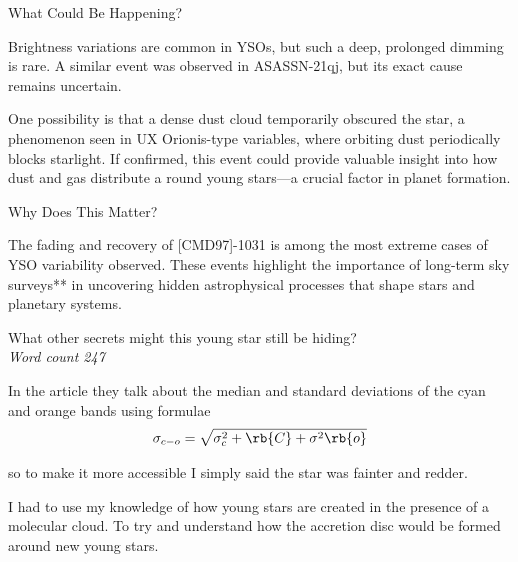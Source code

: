 \documentclass{tufte-handout}
\begin{document}
\begin{question}
{\Large What Could Be Happening?}

Brightness variations are common in YSOs, but such a deep, prolonged dimming is rare. A similar 
event was observed in ASASSN-21qj, but its exact cause remains uncertain.

One possibility is that a dense dust cloud temporarily obscured the star, a phenomenon 
seen in UX Orionis-type variables, where orbiting dust periodically blocks starlight. 
If confirmed, this event could provide valuable insight into how dust and gas distribute a
round young stars—a crucial factor in planet formation.

{\Large Why Does This Matter?}

The fading and recovery of [CMD97]-1031 is among the most extreme cases of YSO variability observed. 
These events highlight the importance of long-term sky surveys** in uncovering hidden 
astrophysical processes that shape stars and planetary systems.

What other secrets might this young star still be hiding?\\
\hfill \textit{Word count 247}

\vspace{5cm}

\qpart
\qsubpart
In the article they talk about the median and standard deviations of the cyan and orange bands using formulae
\[ \sigma_{c-o} = \sqrt{\sigma_c^{2}+\rb{C} + \sigma^2\rb{o}}\]

so to make it more accessible I simply said the star was fainter and redder.

\qsubpart

I had to use my knowledge of how young stars are created in the presence of a molecular cloud. To try and understand
how the accretion disc would be formed around new young stars.

\end{question}
\end{document}
